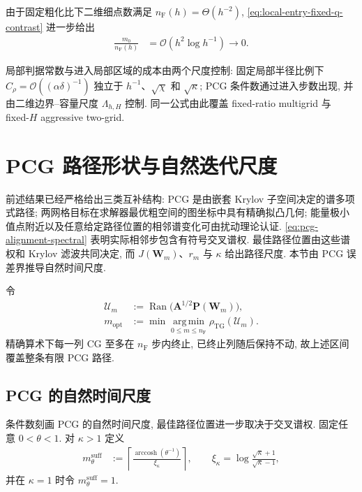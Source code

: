 \documentclass{ctexart}
\renewcommand{\O}{\mathcal{O}}
\newcommand{\dt}{\delta}
\renewcommand{\le}{\leqslant}
\DeclareMathOperator{\arccosh}{arccosh}
\DeclareMathOperator{\Ran}{Ran}
\begin{document}
由于固定粗化比下二维细点数满足
$n_{\mathrm F}(h)=\Theta(h^{-2})$,
\cref{eq:local-entry-fixed-q-contrast} 进一步给出
\begin{align}
    \frac{m_0}{n_{\mathrm F}(h)}
    &=\O(h^2\log h^{-1})\to0.
    \label{eq:local-entry-vs-dimension}
\end{align}


局部判据常数与进入局部区域的成本由两个尺度控制: 固定局部半径比例下 $C_\rho=\O((\alpha\dt)^{-1})$ 独立于 $h^{-1}$、$\sqrt\chi$ 和 $\sqrt\kappa$; PCG 条件数通过进入步数出现, 并由二维边界--容量尺度 $\Lambda_{h,H}$ 控制. 同一公式由此覆盖 fixed-ratio multigrid 与 fixed-$H$ aggressive two-grid.

\section{PCG 路径形状与自然迭代尺度}
\label{sec:pcg-path-shape-mopt}

前述结果已经严格给出三类互补结构: PCG 是由嵌套 Krylov 子空间决定的谱多项式路径;
两网格目标在求解器最优粗空间的图坐标中具有精确拟凸几何;
能量极小值点附近以及任意给定路径位置的相邻谱变化可由扰动理论认证.
\cref{eq:pcg-alignment-spectral} 表明实际相邻步包含有符号交叉谱权. 最佳路径位置由这些谱权和 Krylov 滤波共同决定, 而 $J(\bm W_m)$、$r_m$ 与 $\kappa$ 给出路径尺度. 本节由 PCG 误差界推导自然时间尺度.

令
\begin{align}
    \mathcal U_m
    &:={\Ran}\bigl(\bm A^{1/2}\bm P(\bm W_m)\bigr),
    \label{eq:pcg-path-subspace-final}\\
    m_{\mathrm{opt}}
    &:=\min\operatorname*{arg\,min}_{0\le m\le n_{\mathrm F}}
      \rho_{\mathrm{TG}}(\mathcal U_m).
    \label{eq:mopt-global-definition-final}
\end{align}
精确算术下每一列 CG 至多在 $n_{\mathrm F}$ 步内终止, 已终止列随后保持不动,
故上述区间覆盖整条有限 PCG 路径.

\subsection{PCG 的自然时间尺度}
\label{subsec:natural-krylov-time-scale}

条件数刻画 PCG 的自然时间尺度, 最佳路径位置进一步取决于交叉谱权.
固定任意 $0<\theta<1$. 对 $\kappa>1$ 定义
\begin{align}
    m_{\theta}^{\mathrm{suff}}
    &:=\left\lceil
      \frac{\arccosh(\theta^{-1})}{\xi_\kappa}
      \right\rceil,
    \qquad
    \xi_\kappa=\log\frac{\sqrt\kappa+1}{\sqrt\kappa-1},
    \label{eq:fixed-reduction-sufficient-steps}
\end{align}
并在 $\kappa=1$ 时令 $m_{\theta}^{\mathrm{suff}}=1$.
\end{document}

